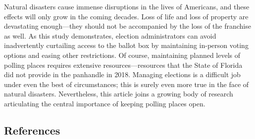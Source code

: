 \documentclass[
  12pt,
]{article}
\begin{document}
Natural disasters cause immense disruptions in the lives of Americans, and these effects will only grow in the coming decades. Loss of life and loss of property are devastating enough---they should not be accompanied by the loss of the franchise as well. As this study demonstrates, election administrators can avoid inadvertently curtailing access to the ballot box by maintaining in-person voting options and easing other restrictions. Of course, maintaining planned levels of polling places requires extensive resources---resources that the State of Florida did not provide in the panhandle in 2018. Managing elections is a difficult job under even the best of circumstances; this is surely even more true in the face of natural disasters. Nevertheless, this article joins a growing body of research articulating the central importance of keeping polling places open.

\newpage

\hypertarget{references}{%
\subsection*{References}\label{references}}
\end{document}
